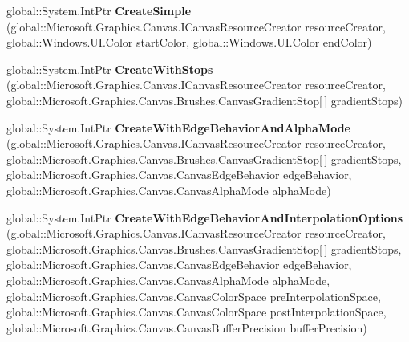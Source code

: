 \begin{DoxyCompactItemize}
\item 
\mbox{\label{interface_microsoft_1_1_graphics_1_1_canvas_1_1_brushes_1_1_i_canvas_radial_gradient_brush_factory_a6861e2be6484e9f7f56a0cc1d83ca34c}} 
global\+::\+System.\+Int\+Ptr {\bfseries Create\+Simple} (global\+::\+Microsoft.\+Graphics.\+Canvas.\+I\+Canvas\+Resource\+Creator resource\+Creator, global\+::\+Windows.\+U\+I.\+Color start\+Color, global\+::\+Windows.\+U\+I.\+Color end\+Color)
\item 
\mbox{\label{interface_microsoft_1_1_graphics_1_1_canvas_1_1_brushes_1_1_i_canvas_radial_gradient_brush_factory_afc3f3252c0427106726cd1a4505083e6}} 
global\+::\+System.\+Int\+Ptr {\bfseries Create\+With\+Stops} (global\+::\+Microsoft.\+Graphics.\+Canvas.\+I\+Canvas\+Resource\+Creator resource\+Creator, global\+::\+Microsoft.\+Graphics.\+Canvas.\+Brushes.\+Canvas\+Gradient\+Stop\mbox{[}$\,$\mbox{]} gradient\+Stops)
\item 
\mbox{\label{interface_microsoft_1_1_graphics_1_1_canvas_1_1_brushes_1_1_i_canvas_radial_gradient_brush_factory_a1c2661a56e5f23c59af42855da35b8d9}} 
global\+::\+System.\+Int\+Ptr {\bfseries Create\+With\+Edge\+Behavior\+And\+Alpha\+Mode} (global\+::\+Microsoft.\+Graphics.\+Canvas.\+I\+Canvas\+Resource\+Creator resource\+Creator, global\+::\+Microsoft.\+Graphics.\+Canvas.\+Brushes.\+Canvas\+Gradient\+Stop\mbox{[}$\,$\mbox{]} gradient\+Stops, global\+::\+Microsoft.\+Graphics.\+Canvas.\+Canvas\+Edge\+Behavior edge\+Behavior, global\+::\+Microsoft.\+Graphics.\+Canvas.\+Canvas\+Alpha\+Mode alpha\+Mode)
\item 
\mbox{\label{interface_microsoft_1_1_graphics_1_1_canvas_1_1_brushes_1_1_i_canvas_radial_gradient_brush_factory_aac0f3cc49f1ab7fde8ab93a987bb9d2a}} 
global\+::\+System.\+Int\+Ptr {\bfseries Create\+With\+Edge\+Behavior\+And\+Interpolation\+Options} (global\+::\+Microsoft.\+Graphics.\+Canvas.\+I\+Canvas\+Resource\+Creator resource\+Creator, global\+::\+Microsoft.\+Graphics.\+Canvas.\+Brushes.\+Canvas\+Gradient\+Stop\mbox{[}$\,$\mbox{]} gradient\+Stops, global\+::\+Microsoft.\+Graphics.\+Canvas.\+Canvas\+Edge\+Behavior edge\+Behavior, global\+::\+Microsoft.\+Graphics.\+Canvas.\+Canvas\+Alpha\+Mode alpha\+Mode, global\+::\+Microsoft.\+Graphics.\+Canvas.\+Canvas\+Color\+Space pre\+Interpolation\+Space, global\+::\+Microsoft.\+Graphics.\+Canvas.\+Canvas\+Color\+Space post\+Interpolation\+Space, global\+::\+Microsoft.\+Graphics.\+Canvas.\+Canvas\+Buffer\+Precision buffer\+Precision)

\end{DoxyCompactItemize}

